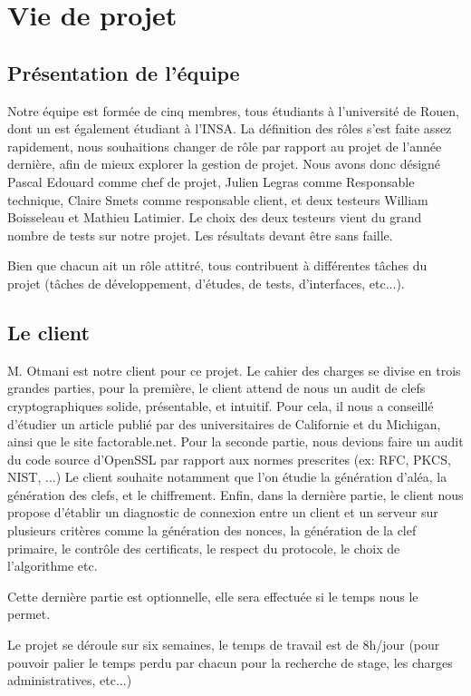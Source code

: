 \chapter{Vie de projet}
\section{Présentation de l'équipe}

Notre équipe est formée de cinq membres, tous étudiants à l'université de Rouen, dont un est également étudiant à l'INSA.
La définition des rôles s'est faite assez rapidement, nous souhaitions changer de rôle par rapport au projet de l'année dernière, afin de mieux explorer la gestion de projet.
Nous avons donc désigné Pascal Edouard comme chef de projet, Julien Legras comme Responsable technique, Claire Smets comme responsable client, et deux testeurs William Boisseleau et Mathieu Latimier.
Le choix des deux testeurs vient  du grand nombre de tests sur notre projet. Les résultats devant être sans faille.

Bien que chacun ait un rôle attitré, tous contribuent à différentes tâches du projet (tâches de développement, d'études, de tests, d'interfaces, etc...).

\section{Le client}

M. Otmani est notre client pour ce projet. Le cahier des charges se divise en trois grandes parties, pour la première, le client attend de nous un audit de clefs cryptographiques solide, présentable, et intuitif. Pour cela, il nous a conseillé d'étudier un article publié par des universitaires de Californie et du Michigan, ainsi que le site factorable.net.
Pour la seconde partie, nous devions faire un audit du code source d'OpenSSL par rapport aux normes prescrites (ex: RFC, PKCS, NIST, ...)
Le client souhaite notamment que l'on étudie la génération d'aléa, la génération des clefs, et le chiffrement.
Enfin, dans la dernière partie, le client nous propose d'établir un diagnostic de connexion entre un client et un serveur sur plusieurs critères comme la génération des nonces, la génération de la clef primaire, le contrôle des certificats, le respect du protocole, le choix de l'algorithme etc.

Cette dernière partie est optionnelle, elle sera effectuée si le temps nous le permet.

Le projet se déroule sur six semaines, le temps de travail est de 8h/jour (pour pouvoir palier le temps perdu par chacun pour la recherche de stage, les charges administratives, etc...)

